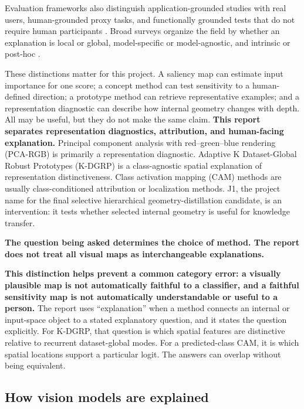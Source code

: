 Evaluation frameworks also distinguish application-grounded studies with real users,
human-grounded proxy tasks, and functionally grounded tests that do not require
human participants \cite{doshivelez2017rigorous}. Broad surveys organize the
field by whether an explanation is local or global, model-specific or
model-agnostic, and intrinsic or post-hoc
\cite{guidotti2018survey,arrieta2020xai,samek2021explaining}.

These distinctions matter for this project. A saliency map can estimate input
importance for one score; a concept method can test sensitivity to a
human-defined direction; a prototype method can retrieve representative
examples; and a representation diagnostic can describe how internal geometry
changes with depth. All may be useful, but they do not make the same claim.
\textbf{This report separates representation diagnostics, attribution, and
human-facing explanation.} Principal component analysis with
red--green--blue rendering (PCA-RGB) is primarily a representation diagnostic.
Adaptive K Dataset-Global Robust Prototypes (K-DGRP) is a class-agnostic
spatial explanation of representation distinctiveness. Class activation
mapping (CAM) methods are usually class-conditioned attribution or localization
methods. J1, the project name for the final selective hierarchical
geometry-distillation candidate, is an intervention:
it tests whether selected internal geometry is useful for knowledge transfer.

\textbf{The question being asked determines the choice of method. The report
does not treat all visual maps as interchangeable explanations.}

\textbf{This distinction helps prevent a common category error: a visually
plausible map is not automatically faithful to a classifier, and a faithful
sensitivity map is not automatically understandable or useful to a person.}
The report uses
``explanation'' when a method connects an internal or input-space object to a
stated explanatory question, and it states the question explicitly. For
K-DGRP, that question is which spatial features are distinctive relative to
recurrent dataset-global modes. For a predicted-class CAM, it is which spatial
locations support a particular logit. The answers can overlap without being
equivalent.

\subsection{How vision models are explained}

